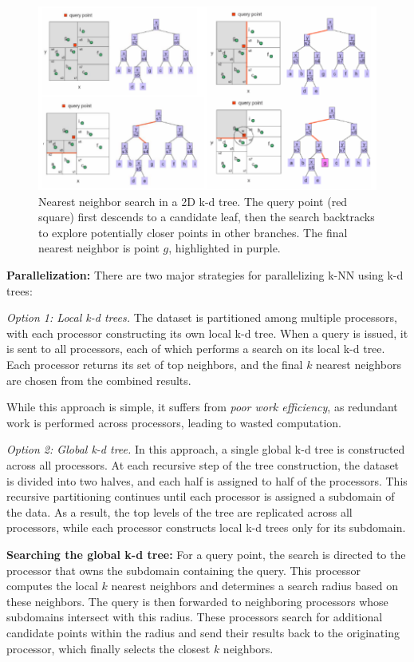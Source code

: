 \documentclass[12pt]{book}
\begin{document}
\begin{enumerate}
\begin{figure}[H]
    \centering
    \includegraphics[width=0.9\linewidth]{images/kdtree_nnsearch.png}
    \caption{Nearest neighbor search in a 2D k-d tree. The query point (red square) first descends to a candidate leaf, then the search backtracks to explore potentially closer points in other branches. The final nearest neighbor is point $g$, highlighted in purple.}
    \label{fig:kdtreeNNsearch}
\end{figure}

\end{enumerate}

\textbf{Parallelization:}  
There are two major strategies for parallelizing k-NN using k-d trees:

\textit{Option 1: Local k-d trees.}  
The dataset is partitioned among multiple processors, with each processor constructing its own local k-d tree. When a query is issued, it is sent to all processors, each of which performs a search on its local k-d tree. Each processor returns its set of top neighbors, and the final $k$ nearest neighbors are chosen from the combined results.  

While this approach is simple, it suffers from \textit{poor work efficiency}, as redundant work is performed across processors, leading to wasted computation.  

\textit{Option 2: Global k-d tree.}  
In this approach, a single global k-d tree is constructed across all processors. At each recursive step of the tree construction, the dataset is divided into two halves, and each half is assigned to half of the processors. This recursive partitioning continues until each processor is assigned a subdomain of the data. As a result, the top levels of the tree are replicated across all processors, while each processor constructs local k-d trees only for its subdomain.  

\textbf{Searching the global k-d tree:}  
For a query point, the search is directed to the processor that owns the subdomain containing the query. This processor computes the local $k$ nearest neighbors and determines a search radius based on these neighbors. The query is then forwarded to neighboring processors whose subdomains intersect with this radius. These processors search for additional candidate points within the radius and send their results back to the originating processor, which finally selects the closest $k$ neighbors.  
\end{document}
